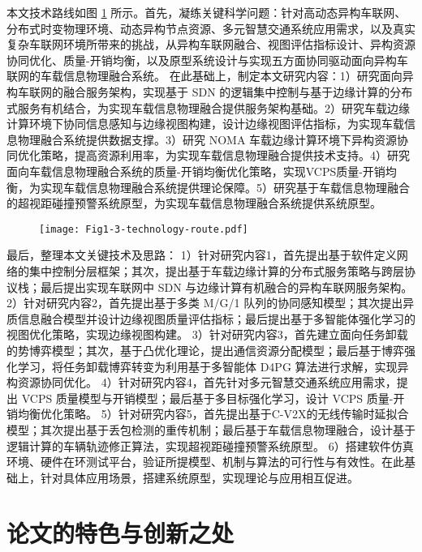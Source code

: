 本文技术路线如图 \ref{fig 1-3} 所示。首先，凝练关键科学问题：针对高动态异构车联网、分布式时变物理环境、动态异构节点资源、多元智慧交通系统应用需求，以及真实复杂车联网环境所带来的挑战，从异构车联网融合、视图评估指标设计、异构资源协同优化、质量-开销均衡，以及原型系统设计与实现五方面协同驱动面向异构车联网的车载信息物理融合系统。
在此基础上，制定本文研究内容：1）研究面向异构车联网的融合服务架构，实现基于 SDN 的逻辑集中控制与基于边缘计算的分布式服务有机结合，为实现车载信息物理融合提供服务架构基础。2）研究车载边缘计算环境下协同信息感知与边缘视图构建，设计边缘视图评估指标，为实现车载信息物理融合系统提供数据支撑。3）研究 NOMA 车载边缘计算环境下异构资源协同优化策略，提高资源利用率，为实现车载信息物理融合提供技术支持。4）研究面向车载信息物理融合系统的质量-开销均衡优化策略，实现VCPS质量-开销均衡，为实现车载信息物理融合系统提供理论保障。5）研究基于车载信息物理融合的超视距碰撞预警系统原型，为实现车载信息物理融合系统提供系统原型。

\begin{figure}[h]
\centering
	\texttt{[image: Fig1-3-technology-route.pdf]}
	\label{fig 1-3}
\end{figure}

最后，整理本文关键技术及思路：
1）针对研究内容1，首先提出基于软件定义网络的集中控制分层框架；其次，提出基于车载边缘计算的分布式服务策略与跨层协议栈；最后提出实现车联网中 SDN 与边缘计算有机融合的异构车联网服务架构。
2）针对研究内容2，首先提出基于多类 M/G/1 队列的协同感知模型；其次提出异质信息融合模型并设计边缘视图质量评估指标；最后提出基于多智能体强化学习的视图优化策略，实现边缘视图构建。
3）针对研究内容3，首先建立面向任务卸载的势博弈模型；其次，基于凸优化理论，提出通信资源分配模型；最后基于博弈强化学习，将任务卸载博弈转变为利用基于多智能体 D4PG 算法进行求解，实现异构资源协同优化。
4）针对研究内容4，首先针对多元智慧交通系统应用需求，提出 VCPS 质量模型与开销模型；最后基于多目标强化学习，设计 VCPS 质量-开销均衡优化策略。
5）针对研究内容5，首先提出基于C-V2X的无线传输时延拟合模型；其次提出基于丢包检测的重传机制；最后基于车载信息物理融合，设计基于逻辑计算的车辆轨迹修正算法，实现超视距碰撞预警系统原型。
6）搭建软件仿真环境、硬件在环测试平台，验证所提模型、机制与算法的可行性与有效性。在此基础上，针对具体应用场景，搭建系统原型，实现理论与应用相互促进。

\section{论文的特色与创新之处}\label{section 1-6}

